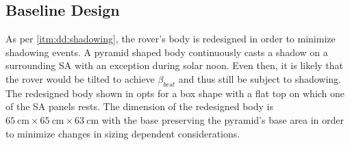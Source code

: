 \subsection{Baseline Design}
As per \ref{itm:dd:shadowing}, the rover's body is redesigned in order to minimize shadowing events. A pyramid shaped body continuously casts a shadow on a surrounding \ac{SA} with an exception during solar noon. Even then, it is likely that the rover would be tilted to achieve $\beta_{best}$ and thus still be subject to shadowing. The redesigned body shown in  opts for a box shape with a flat top on which one of the \ac{SA} panels rests. The dimension of the redesigned body is $\SI{65}{\centi\meter}\times\SI{65}{\centi\meter}\times\SI{63}{\centi\meter}$ with the base preserving the pyramid's base area in order to minimize changes in sizing dependent considerations.

